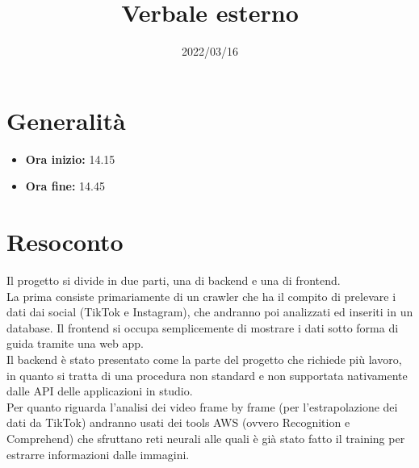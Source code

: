 \documentclass{classes/base}
\title{Verbale esterno}
\date{2022/03/16}
\author{\marcob}
\renewcommand{\maketitle}{
    
}
\begin{document}
    \maketitle

    \section*{Generalità}
    \begin{itemize}
        \item \textbf{Ora inizio:} 14.15
        \item \textbf{Ora fine:} 14.45
    \end{itemize}

    \section*{Resoconto}
    Il progetto si divide in due parti, una di backend e una di frontend.\\
    La prima consiste primariamente di un crawler che ha il compito di prelevare i dati dai social (TikTok e Instagram), che andranno poi analizzati ed inseriti in un database.
    Il frontend si occupa semplicemente di mostrare i dati sotto forma di guida tramite una web app.\\
    Il backend è stato presentato come la parte del progetto che richiede più lavoro, in quanto si tratta di una procedura non standard e non supportata nativamente dalle API delle applicazioni in studio.\\
    Per quanto riguarda l'analisi dei video frame by frame (per l'estrapolazione dei dati da TikTok) andranno usati dei tools AWS (ovvero Recognition e Comprehend) che sfruttano reti neurali alle quali è già stato fatto il training per estrarre informazioni dalle immagini.
\end{document}

